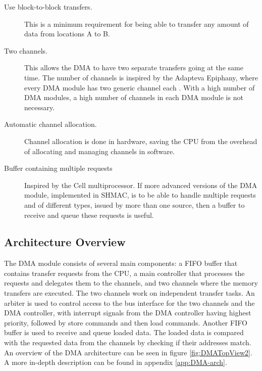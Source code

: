 \begin{description}
	\item[Use block-to-block transfers.] This is a minimum requirement for being
	able to transfer any amount of data from locations A to B.
	\item[Two channels.] This allows the DMA to have two separate transfers going
	at the same time.
	The number of channels is inspired by the Adapteva Epiphany, where every DMA module has two generic channel each \cite{epiphany}.
	With a high number of DMA modules, a high number of channels in each DMA module is not necessary.
	\item[Automatic channel allocation.] Channel allocation is done in hardware,
	saving the CPU from the overhead of allocating and managing channels in software.
	\item[Buffer containing multiple requests] Inspired by the Cell multiprocessor.
	If more advanced versions of the DMA module, implemented in SHMAC, is to be able to handle multiple requests and of different types, issued by more than one source, then a buffer to receive and queue these requests is useful.
\end{description}

\subsection{Architecture Overview}

The DMA module consists of several main components: a FIFO buffer that contains transfer requests from the CPU, a main controller that processes the requests and delegates them to the channels, and two channels where the memory transfers are executed.
The two channels work on independent transfer tasks.
An arbiter is used to control access to the bus interface for the two channels and the DMA controller, with interrupt signals from the DMA controller having highest priority, followed by store commands and then load commands.
Another FIFO buffer is used to receive and queue loaded data.
The loaded data is compared with the requested data from the channels by checking if their addresses match. 
An overview of the DMA architecture can be seen in figure \ref{fig:DMATopView2}. A more in-depth description
can be found in appendix \ref{app:DMA-arch}.

